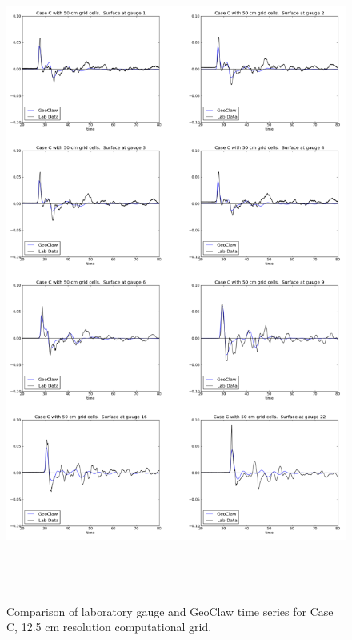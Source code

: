 \begin{figure}[ht]
\hfil\includegraphics[height=8.5in]{bp6/C50Gages.png}\hfil
\caption{\label{C50Gages}
Comparison of laboratory gauge and GeoClaw time series for Case C, 12.5 cm resolution computational grid.
  }
\end{figure}

